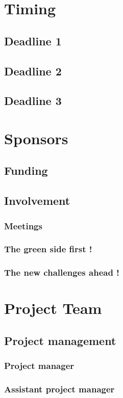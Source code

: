 \documentclass[8pt]{article} %
\begin{document}
\section{Timing}
\subsection{Deadline 1}
\subsection{Deadline 2}
\subsection{Deadline 3}

\section{Sponsors}
\subsection{Funding}
\subsection{Involvement}
\subsubsection{Meetings}
\subsubsection{The green side first !}
\subsubsection{The new challenges ahead !}

\clearpage
\section{Project Team}

\subsection{Project management}
\subsubsection{Project manager}
\subsubsection{Assistant project manager}
\end{document}
